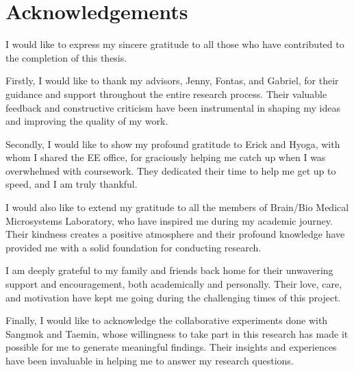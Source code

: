 \thispagestyle{main}
\chapter*{Acknowledgements}
I would like to express my sincere gratitude to all those who have contributed to the completion of this thesis.

Firstly, I would like to thank my advisors, Jenny, Fontas, and Gabriel, for their guidance and support throughout the entire research process. Their valuable feedback and constructive criticism have been instrumental in shaping my ideas and improving the quality of my work.

Secondly, I would like to show my profound gratitude to Erick and Hyoga, with whom I shared the EE office, for graciously helping me catch up when I was overwhelmed with coursework. They dedicated their time to help me get up to speed, and I am truly thankful.

I would also like to extend my gratitude to all the members of Brain/Bio Medical Microsystems Laboratory, who have inspired me during my academic journey. Their kindness creates a positive atmosphere and their profound knowledge have provided me with a solid foundation for conducting research.

I am deeply grateful to my family and friends back home for their unwavering support and encouragement, both academically and personally. Their love, care, and motivation have kept me going during the challenging times of this project.

Finally, I would like to acknowledge the collaborative experiments done with Sangmok and Taemin, whose willingness to take part in this research has made it possible for me to generate meaningful findings. Their insights and experiences have been invaluable in helping me to answer my research questions.

